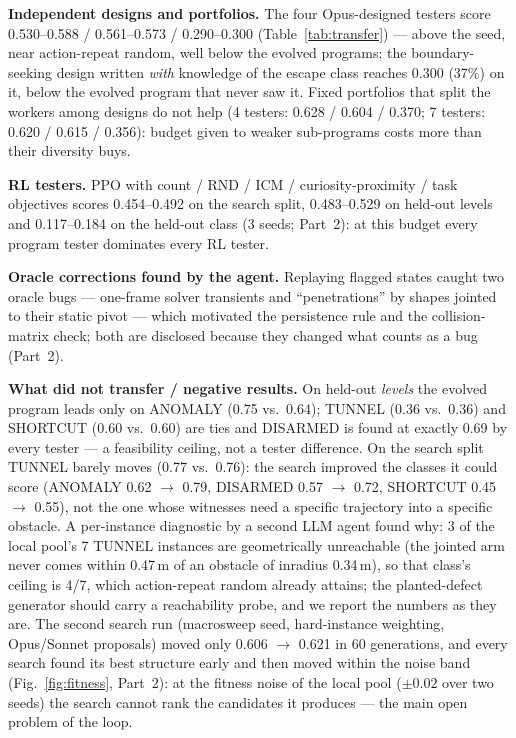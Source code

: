 \textbf{Independent designs and portfolios.} The four Opus-designed testers score 0.530--0.588 / 0.561--0.573 / 0.290--0.300
(Table~\ref{tab:transfer}) --- above the seed, near action-repeat random, well below the evolved programs; the boundary-seeking design
written \emph{with} knowledge of the escape class reaches 0.300 (37\%) on it, below the evolved program that never saw it. Fixed
portfolios that split the workers among designs do not help (4 testers: 0.628 / 0.604 / 0.370; 7 testers: 0.620 / 0.615 / 0.356):
budget given to weaker sub-programs costs more than their diversity buys.

\textbf{RL testers.} PPO with count / RND / ICM / curiosity-proximity / task objectives scores 0.454--0.492 on the search split,
0.483--0.529 on held-out levels and 0.117--0.184 on the held-out class (3 seeds; Part~2): at this budget every program tester
dominates every RL tester.

\textbf{Oracle corrections found by the agent.} Replaying flagged states caught two oracle bugs --- one-frame solver transients and
``penetrations'' by shapes jointed to their static pivot --- which motivated the persistence rule and the collision-matrix check; both are
disclosed because they changed what counts as a bug (Part~2).

\textbf{What did not transfer / negative results.} On held-out \emph{levels} the evolved program leads only on ANOMALY (0.75 vs.\ 0.64);
TUNNEL (0.36 vs.\ 0.36) and SHORTCUT (0.60 vs.\ 0.60) are ties and DISARMED is found at exactly 0.69 by every tester --- a feasibility
ceiling, not a tester difference. On the search split TUNNEL barely moves (0.77 vs.\ 0.76): the search improved the classes it could score
(ANOMALY 0.62 $\to$ 0.79, DISARMED 0.57 $\to$ 0.72, SHORTCUT 0.45 $\to$ 0.55), not the one whose witnesses need a specific trajectory into
a specific obstacle. A per-instance diagnostic by a second LLM agent found why: 3 of the local pool's 7 TUNNEL instances are geometrically
unreachable (the jointed arm never comes within 0.47\,m of an obstacle of inradius 0.34\,m), so that class's ceiling is 4/7, which
action-repeat random already attains; the planted-defect generator should carry a reachability probe, and we report the numbers as they
are. The second search run (macrosweep seed, hard-instance weighting, Opus/Sonnet proposals) moved only 0.606 $\to$ 0.621 in 60
generations, and every search found its best structure early and then moved within the noise band (Fig.~\ref{fig:fitness}, Part~2): at the fitness
noise of the local pool ($\pm0.02$ over two seeds) the search cannot rank the candidates it produces --- the main open problem of the loop.
